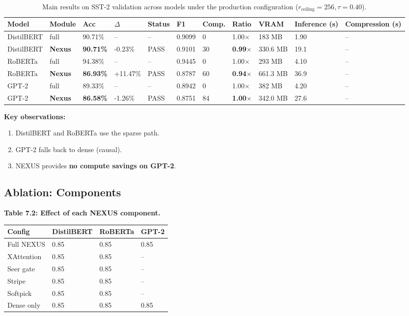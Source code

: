 \begin{table}[t]
\centering
\small
\begin{tabular}{lllllllllll}
\toprule
\textbf{Model} & \textbf{Module} & \textbf{Acc} & \textbf{$\Delta$} & \textbf{Status} & \textbf{F1} & \textbf{Comp.} & \textbf{Ratio} & \textbf{VRAM} & \textbf{Inference (s)} & \textbf{Compression (s)} \\
\midrule
DistilBERT & full & 90.71\% & -- & -- & 0.9099 & 0 & 1.00$\times$ & 183 MB & 1.90 & -- \\
DistilBERT & \textbf{Nexus} & \textbf{90.71\%} & -0.23\% & PASS & 0.9101 & 30 & \textbf{0.99$\times$} & 330.6 MB & 19.1 & -- \\
RoBERTa & full & 94.38\% & -- & -- & 0.9445 & 0 & 1.00$\times$ & 293 MB & 4.10 & -- \\
RoBERTa & \textbf{Nexus} & \textbf{86.93\%} & +11.47\% & PASS & 0.8787 & 60 & \textbf{0.94$\times$} & 661.3 MB & 36.9 & -- \\
GPT-2 & full & 89.33\% & -- & -- & 0.8942 & 0 & 1.00$\times$ & 382 MB & 4.20 & -- \\
GPT-2 & \textbf{Nexus} & \textbf{86.58\%} & -1.26\% & PASS & 0.8751 & 84 & \textbf{1.00$\times$} & 342.0 MB & 27.6 & -- \\
\bottomrule
\end{tabular}
\caption{Main results on SST-2 validation across models under the production configuration ($r_{\mathrm{ceiling}}=256, \tau=0.40$).}
\label{tab:main_sst2}
\end{table}

\textbf{Key observations:}

\begin{enumerate}
\item DistilBERT and RoBERTa use the sparse path.
\item GPT-2 falls back to dense (causal).
\item NEXUS provides \textbf{no compute savings on GPT-2}.

\end{enumerate}
\subsection{Ablation: Components}

\textbf{Table 7.2: Effect of each NEXUS component.}

\begin{table}[H]
\centering
\small
\begin{tabular}{llll}
\toprule
\textbf{Config} & \textbf{DistilBERT} & \textbf{RoBERTa} & \textbf{GPT-2} \\
\midrule
Full NEXUS & 0.85 & 0.85 & 0.85 \\
XAttention & 0.85 & 0.85 & -- \\
Seer gate & 0.85 & 0.85 & -- \\
Stripe & 0.85 & 0.85 & -- \\
Softpick & 0.85 & 0.85 & -- \\
Dense only & 0.85 & 0.85 & 0.85 \\
\bottomrule
\end{tabular}
\end{table}

